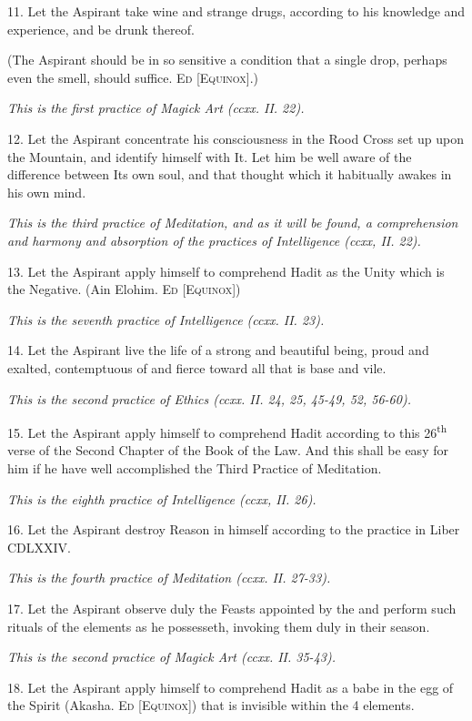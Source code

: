 11. Let the Aspirant take wine and strange drugs, according to his knowledge and experience, and be drunk thereof.

(The Aspirant should be in so sensitive a condition that a single drop, perhaps even the smell, should suffice. \textsc{Ed [Equinox]}.)

\textit{This is the first practice of Magick Art (ccxx. II. 22).}

12. Let the Aspirant concentrate his consciousness in the Rood Cross set up upon the Mountain, and identify himself with It. Let him be well aware of the difference between Its own soul, and that thought which it habitually awakes in his own mind.

\textit{This is the third practice of Meditation, and as it will be found, a comprehension and harmony and absorption of the practices of Intelligence (ccxx, II. 22).}

13. Let the Aspirant apply himself to comprehend Hadit as the Unity which is the Negative. (Ain Elohim. \textsc{Ed [Equinox]})

\textit{This is the seventh practice of Intelligence (ccxx. II. 23).}

14. Let the Aspirant live the life of a strong and beautiful being, proud and exalted, contemptuous of and fierce toward all that is base and vile.

\textit{This is the second practice of Ethics (ccxx. II. 24, 25, 45-49, 52, 56-60).}

15. Let the Aspirant apply himself to comprehend Hadit according to this 26\textsuperscript{th} verse of the Second Chapter of the Book of the Law. And this shall be easy for him if he have well accomplished the Third Practice of Meditation.

\textit{This is the eighth practice of Intelligence (ccxx, II. 26).}

16. Let the Aspirant destroy Reason in himself according to the practice in Liber CDLXXIV.

\textit{This is the fourth practice of Meditation (ccxx. II. 27-33).}

17.
Let the Aspirant observe duly the Feasts appointed by the \Argentium{} and perform such rituals of the elements as he possesseth, invoking them duly in their season.

\textit{This is the second practice of Magick Art (ccxx. II. 35-43).}

18. Let the Aspirant apply himself to comprehend Hadit as a babe in the egg of the Spirit (Akasha. \textsc{Ed [Equinox]}) that is invisible within the 4 elements.

